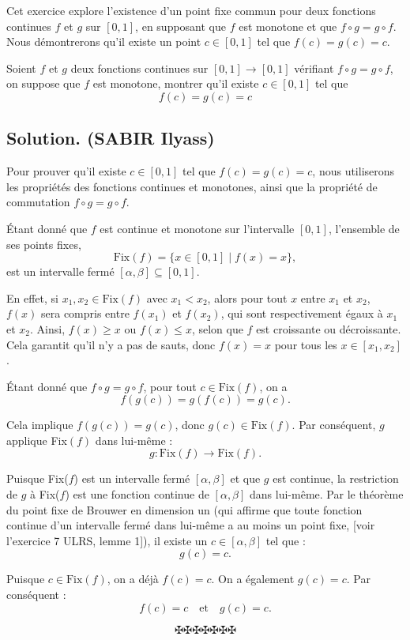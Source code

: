 Cet exercice explore l'existence d'un point fixe commun pour deux fonctions
continues $f$ et $g$ sur $[0, 1]$, en supposant que $f$ est monotone et que $f
\circ g = g \circ f$. Nous d{\'e}montrerons qu'il existe un point $c \in [0,
1]$ tel que $f (c) = g (c) = c$.
\begin{exercise}
Soient $f$ et $g$ deux fonctions continues sur $[0, 1] \rightarrow [0, 1]$
v{\'e}rifiant $f \circ g = g \circ f$, on suppose que $f$ est monotone,
montrer qu'il existe $c \in [0, 1]$ tel que
\[ f (c) = g (c) = c \]
\end{exercise}

\subsection*{Solution. (SABIR Ilyass)}

Pour prouver qu'il existe $c \in [0, 1]$ tel que $f (c) = g (c) = c$, nous
utiliserons les propri{\'e}t{\'e}s des fonctions continues et monotones, ainsi
que la propri{\'e}t{\'e} de commutation $f \circ g = g \circ f$.

{\'E}tant donn{\'e} que $f$ est continue et monotone sur l'intervalle $[0,
1]$, l'ensemble de ses points fixes,
\[ \text{Fix} (f) =\{x \in [0, 1] \mid f (x) = x\}, \]
est un intervalle ferm{\'e} $[\alpha, \beta] \subseteq [0, 1]$.

En effet, si $x_1, x_2 \in \text{Fix} (f)$ avec $x_1 < x_2$, alors pour tout
$x$ entre $x_1$ et $x_2$, $f (x)$ sera compris entre $f (x_1)$ et $f (x_2)$,
qui sont respectivement {\'e}gaux {\`a} $x_1$ et $x_2$. Ainsi, $f (x) \geq x$
ou $f (x) \leq x$, selon que $f$ est croissante ou d{\'e}croissante. Cela
garantit qu'il n'y a pas de sauts, donc $f (x) = x$ pour tous les $x \in [x_1,
x_2]$.

{\'E}tant donn{\'e} que $f \circ g = g \circ f$, pour tout $c \in \text{Fix}
(f)$, on a
\[ f (g (c)) = g (f (c)) = g (c) . \]


Cela implique $f (g (c)) = g (c)$, donc $g (c) \in \text{Fix} (f)$. Par
cons{\'e}quent, $g$ applique Fix$(f)$ dans lui-m{\^e}me :
\[ g : \text{Fix} (f) \rightarrow \text{Fix} (f) . \]


Puisque Fix($f$) est un intervalle ferm{\'e} $[\alpha, \beta]$ et que $g$ est
continue, la restriction de $g$ {\`a} Fix($f$) est une fonction continue de
$[\alpha, \beta]$ dans lui-m{\^e}me. Par le th{\'e}or{\`e}me du point fixe de
Brouwer en dimension un (qui affirme que toute fonction continue d'un
intervalle ferm{\'e} dans lui-m{\^e}me a au moins un point fixe, [voir
l'exercice 7 ULRS, lemme 1]), il existe un $c \in [\alpha, \beta]$ tel que :
\[ g (c) = c. \]


Puisque $c \in \text{Fix} (f)$, on a d{\'e}j{\`a} $f (c) = c$. On a
{\'e}galement $g (c) = c$. Par cons{\'e}quent :
\[ f (c) = c \quad \text{et} \quad g (c) = c. \]

\[ \maltese \maltese \maltese \maltese \maltese \maltese \maltese \]
